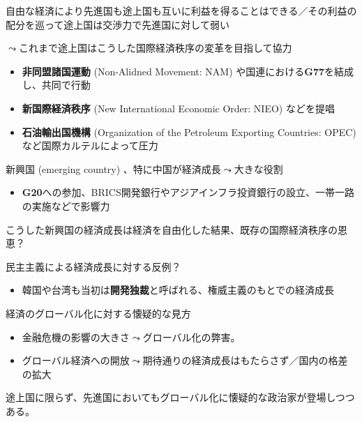 \documentclass[
  xelatex,
  ja=standard]{bxjsarticle}
\providecommand{\tightlist}{%
  \setlength{\itemsep}{0pt}\setlength{\parskip}{0pt}}\usepackage{longtable,booktabs,array}
\begin{document}
自由な経済により先進国も途上国も互いに利益を得ることはできる／その利益の配分を巡って途上国は交渉力で先進国に対して弱い

\(\leadsto\)これまで途上国はこうした国際経済秩序の変革を目指して協力

\begin{itemize}
\tightlist
\item
  \textbf{非同盟諸国運動} (Non-Alidned Movement: NAM)
  や国連における\textbf{G77}を結成し、共同で行動
\item
  \textbf{新国際経済秩序} (New International Economic Order: NIEO)
  などを提唱
\item
  \textbf{石油輸出国機構} (Organization of the Petroleum Exporting
  Countries: OPEC) など国際カルテルによって圧力
\end{itemize}

新興国 (emerging country) 、特に中国が経済成長\(\leadsto\)大きな役割

\begin{itemize}
\tightlist
\item
  \textbf{G20}への参加、BRICS開発銀行やアジアインフラ投資銀行の設立、一帯一路の実施などで影響力
\end{itemize}

こうした新興国の経済成長は経済を自由化した結果、既存の国際経済秩序の恩恵？

民主主義による経済成長に対する反例？

\begin{itemize}
\tightlist
\item
  韓国や台湾も当初は\textbf{開発独裁}と呼ばれる、権威主義のもとでの経済成長
\end{itemize}

経済のグローバル化に対する懐疑的な見方

\begin{itemize}
\tightlist
\item
  金融危機の影響の大きさ\(\leadsto\)グローバル化の弊害。
\item
  グローバル経済への開放\(\leadsto\)期待通りの経済成長はもたらさず／国内の格差の拡大
\end{itemize}

途上国に限らず、先進国においてもグローバル化に懐疑的な政治家が登場しつつある。


  
\end{document}
